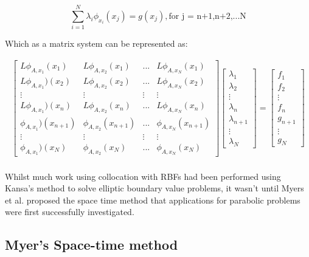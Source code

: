 \documentclass[a4paper]{amsart}
\begin{document}
\begin{equation} \label{eq:Kansa2}
\sum_{i=1}^{N} \lambda_{i} \phi_{x_{i}}(x_{j}) = g(x_{j}),\mbox{for j = n+1,n+2,...N}
\end{equation}

Which as a matrix system can be represented as:


\begin{align*}
\begin{bmatrix}
 L \phi_{A,x_{1}}(x_{1}) &L \phi_{A, x_{2}}(x_{1}) &... &L \phi_{A, x_{N}}(x_{1})\\
 L \phi_{A, x_{1}})(x_{2}) &L \phi_{A, x_{2}}(x_{2}) &... &L \phi_{A, x_{N}}(x_{2})\\
\vdots &\vdots &\vdots &\vdots\\
 L \phi_{A, x_{1}})(x_{n}) &L \phi_{A, x_{2}}(x_{n}) &... &L \phi_{A, x_{N}}(x_{n})\\
 \phi_{A, x_{1}})(x_{n+1}) &\phi_{A, x_{2}}(x_{n+1}) &...  &\phi_{A, x_{N}}(x_{n+1})\\
\vdots &\vdots &\vdots &\vdots\\
 \phi_{A, x_{1}})(x_{N})  &\phi_{A, x_{2}}(x_{N}) &...  &\phi_{A, x_{N}}(x_{N})
\end{bmatrix}
\begin{bmatrix}
\lambda_{1}\\
\lambda_{2}\\
\vdots\\
\lambda_{n}\\
\lambda_{n+1}\\
\vdots\\
\lambda_{N}
\end{bmatrix}
=
\begin{bmatrix}
f_{1}\\
f_{2}\\
\vdots\\
f_{n}\\
g_{n+1}\\
\vdots\\
g_{N}
\end{bmatrix}
\end{align*}\\


Whilst much work using collocation with RBFs had been performed using Kansa's method to solve elliptic boundary value problems, it wasn't until Myers et al. \cite{rbf0} proposed the space time method that applications for parabolic problems were first successfully investigated.


\subsection{Myer's Space-time method}
\end{document}
